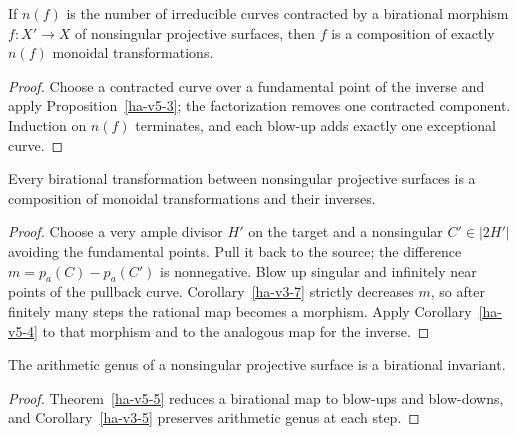 \begin{corollary}
\label{ha-v5-4}
If \(n(f)\) is the number of irreducible curves contracted by a birational
morphism \(f:X'\to X\) of nonsingular projective surfaces, then \(f\) is a
composition of exactly \(n(f)\) monoidal transformations.
\end{corollary}
\begin{proof}
Choose a contracted curve over a fundamental point of the inverse and apply
Proposition~\ref{ha-v5-3}; the factorization removes one contracted component.
Induction on \(n(f)\) terminates, and each blow-up adds exactly one exceptional
curve.
\end{proof}

\begin{theorem}
\label{ha-v5-5}
Every birational transformation between nonsingular projective surfaces is a
composition of monoidal transformations and their inverses.
\end{theorem}
\begin{proof}
Choose a very ample divisor \(H'\) on the target and a nonsingular
\(C'\in|2H'|\) avoiding the fundamental points.  Pull it back to the source;
the difference \(m=p_a(C)-p_a(C')\) is nonnegative.  Blow up singular and
infinitely near points of the pullback curve.  Corollary~\ref{ha-v3-7} strictly
decreases \(m\), so after finitely many steps the rational map becomes a
morphism.  Apply Corollary~\ref{ha-v5-4} to that morphism and to the analogous
map for the inverse.
\end{proof}

\begin{corollary}
\label{ha-v5-6}
The arithmetic genus of a nonsingular projective surface is a birational
invariant.
\end{corollary}
\begin{proof}
Theorem~\ref{ha-v5-5} reduces a birational map to blow-ups and blow-downs, and
Corollary~\ref{ha-v3-5} preserves arithmetic genus at each step.
\end{proof}

